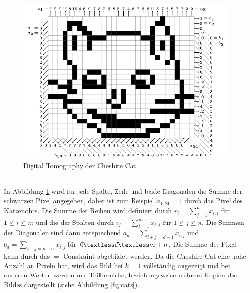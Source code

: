 \documentclass[a4,abstract=on]{scrartcl}
\begin{document}
\begin{figure}[H]
\centering
\includegraphics[width=\textwidth]{cheshire.png}
\caption{Digital Tomography der Cheshire Cat \cite[aus][Seite 25]{Knuth}}
\label{fig:cheshire}
\end{figure}
\ \\
In Abbildung \ref{fig:cheshire} wird für jede Spalte, Zeile und beide Diagonalen die Summe der schwarzen Pixel angegeben, daher ist zum Beispiel $x_{1,24}=1$ durch das Pixel des Katzenohrs. Die Summe der Reihen wird definiert durch $r_i=\sum_{j=1}^{n} x_{i,j}$ für $1 \leq i \leq m$ und die der Spalten durch $c_j=\sum_{i=1}^{m} x_{i,j}$ für $1 \leq j \leq n$. Die Summen der Diagonalen sind dann entsprechend $a_d=\sum_{i+j=d+1} x_{i,j}$ und $b_d=\sum_{i-j=d-n} x_{i,j}$ für $0 \textless d \textless m+n$. Die Summe der Pixel kann durch das $=$-Constraint abgebildet werden. Da die Cheshire Cat eine hohe Anzahl an Pixeln hat, wird das Bild bei $k=1$ vollständig angezeigt und bei anderen Werten werden nur Teilbereiche, beziehungsweise mehrere Kopien des Bildes dargestellt (siehe Abbildung \ref{fig:cats}).
\end{document}

